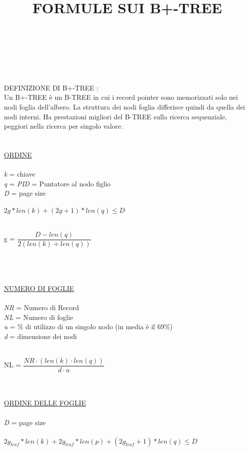 \documentclass[a4paper,12pt]{article}
\begin{document}
	\begin{titlepage}
	\title{{\huge \textbf{FORMULE SUI B+-TREE}}}
	\maketitle\\\\
	\\\\
	DEFINIZIONE DI B+-TREE :	\\
	Un B+-TREE è un B-TREE in cui i record pointer sono memorizzati solo nei nodi foglia dell'albero. La struttura dei nodi foglia differisce quindi da quella dei nodi interni. 
	Ha prestazioni migliori del B-TREE sulla ricerca sequenziale, peggiori nella ricerca per singolo valore. \\ \\ \\
	\underline{ORDINE} \\ \\
	\textit{k} = chiave \\
	\textit{q} = \textit{PID} = Puntatore al nodo figlio \\
	\textit{D} = page size \\ \\
	${2g*len(k) + (2g+1)*len(q) \leq D}$ \\ \\
	\centerline{{\Large g = ${\dfrac{D - len(q)}{2(len(k) + len(q))}}$}} \\ \\ \\
	\underline{NUMERO DI FOGLIE} \\ \\
	\textit{NR} = Numero di Record \\
	\textit{NL} = Numero di foglie \\
	\textit{u} = \% di utilizzo di un singolo nodo (in media è il 69\%) \\
	\textit{d} = dimensione dei nodi \\ \\
	\centerline{{\Large NL = ${\dfrac{NR \cdot (len(k) \cdot len(q))}{d \cdot u}}$}} \\ \\
	\underline{ORDINE DELLE FOGLIE} \\ \\
	\textit{D} = page size \\ \\
	${2g_{leaf}*len(k) + 2g_{leaf}*len(p) + (2g_{leaf}+1)*len(q) \leq D}$ \\ \\

\end{titlepage}
\end{document}
